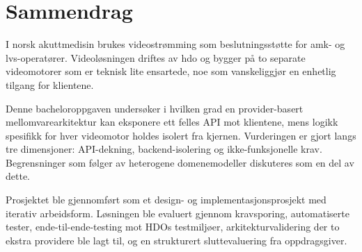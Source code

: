 \chapter*{Sammendrag}

I norsk akuttmedisin brukes videostrømming som beslutningsstøtte for \gls{amk}- og \gls{lvs}-operatører. Videoløsningen driftes av \gls{hdo} og bygger på to separate videomotorer som er teknisk lite ensartede, noe som vanskeliggjør en enhetlig tilgang for klientene.

Denne bacheloroppgaven undersøker i hvilken grad en \gls{provider}-basert \gls{mellomvare}arkitektur kan eksponere ett felles API mot klientene, mens logikk spesifikk for hver videomotor holdes isolert fra kjernen. Vurderingen er gjort langs tre dimensjoner: API-dekning, backend-isolering og ikke-funksjonelle krav. Begrensninger som følger av heterogene domenemodeller diskuteres som en del av dette.


Prosjektet ble gjennomført som et design- og implementasjonsprosjekt med iterativ arbeidsform. Løsningen ble evaluert gjennom kravsporing, automatiserte tester, ende-til-ende-testing mot HDOs testmiljøer, arkitekturvalidering der to ekstra providere ble lagt til, og en strukturert sluttevaluering fra oppdragsgiver.


